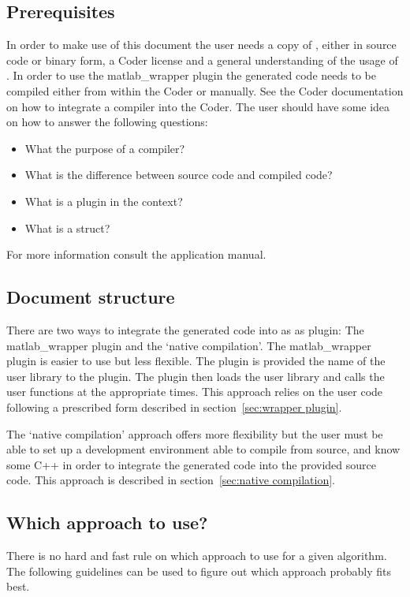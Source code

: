 \documentclass[11pt,a4paper,twoside]{article}
\newcommand{\+}{\discretionary{\mbox{\scriptsize$\hookleftarrow$}}{}{}}
\begin{document}
\subsection*{Prerequisites}
In order to make use of this document the user needs a copy of \mha{}, either
in source code or binary form, a \Matlab{} Coder license and a general
understanding of the usage of \mha{}. In order to use the matlab\_wrapper plugin
the generated code needs to be compiled either from within the \Matlab{} Coder
or manually. See the \Matlab{} Coder documentation on how to integrate a compiler
into the Coder.
The user should have some idea on how to answer the following questions:
\begin{itemize}
\item What the purpose of a compiler?
\item What is the difference between source code and compiled code?
\item What is a plugin in the \mha{} context?
\item What is a \Matlab{} struct?
\end{itemize}
For more information consult the \mha{} application manual.

\subsection*{Document structure}
There are two ways to integrate the generated code into \mha{} as 
as plugin: The matlab\_wrapper plugin and the `native compilation'. The matlab\_wrapper
plugin is easier to use but less flexible. The plugin is provided the name of
the user library to the plugin. The plugin then loads the user library and calls the user functions at the appropriate times.
This approach relies on the user code following a prescribed form described in section~\ref{sec:wrapper plugin}.

The `native compilation' approach offers more flexibility but the user must be able to set up a development environment
able to compile \mha{} from source, and know some C++ in order to integrate the
generated code into the provided source code. This approach is described in section~\ref{sec:native compilation}.

\subsection*{Which approach to use?}
There is no hard and fast rule on which approach to use for a given algorithm. The
following guidelines can be used to figure out which approach probably fits best.
\end{document}
